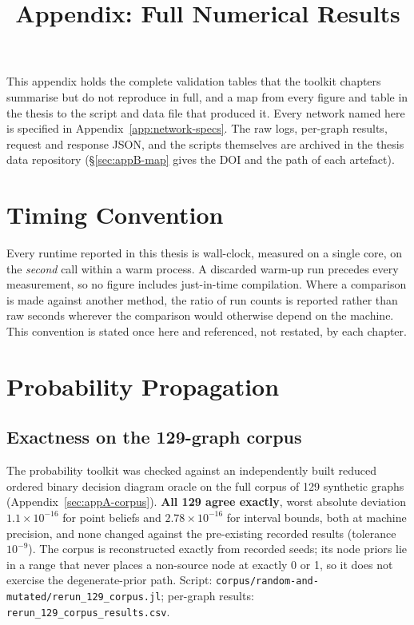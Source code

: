 \documentclass[12pt]{report}
\providecommand{\filepath}[1]{\nolinkurl{#1}}
\begin{document}
\title{Appendix: Full Numerical Results}
\fi

This appendix holds the complete validation tables that the toolkit chapters summarise but
do not reproduce in full, and a map from every figure and table in the thesis to the
script and data file that produced it. Every network named here is specified in
Appendix~\ref{app:network-specs}. The raw logs, per-graph results, request and response
JSON, and the scripts themselves are archived in the thesis data repository
(\S\ref{sec:appB-map} gives the DOI and the path of each artefact).

\section{Timing Convention}
\label{sec:appB-timing}

Every runtime reported in this thesis is wall-clock, measured on a single core, on the
\emph{second} call within a warm process. A discarded warm-up run precedes every
measurement, so no figure includes just-in-time compilation. Where a comparison is made
against another method, the ratio of run counts is reported rather than raw seconds
wherever the comparison would otherwise depend on the machine. This convention is stated
once here and referenced, not restated, by each chapter.

\section{Probability Propagation}
\label{sec:appB-prob}

\subsection{Exactness on the 129-graph corpus}

The probability toolkit was checked against an independently built reduced ordered
binary decision diagram oracle on the full corpus of 129 synthetic graphs
(Appendix~\ref{sec:appA-corpus}). \textbf{All 129 agree exactly}, worst absolute deviation
$1.1 \times 10^{-16}$ for point beliefs and $2.78 \times 10^{-16}$ for interval bounds,
both at machine precision, and none changed against the pre-existing recorded results
(tolerance $10^{-9}$). The corpus is reconstructed exactly from recorded seeds; its node priors lie
in a range that never places a non-source node at exactly 0 or 1, so it does not exercise
the degenerate-prior path. Script:
\filepath{corpus/random-and-mutated/rerun\_129\_corpus.jl}; per-graph results:
\filepath{rerun_129_corpus_results.csv}.
\end{document}

